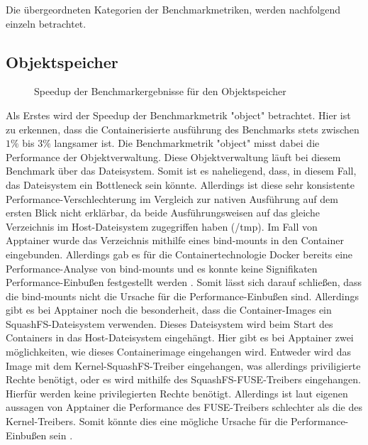 Die übergeordneten Kategorien der Benchmarkmetriken, werden nachfolgend einzeln betrachtet.

\subsection{Objektspeicher}

\begin{figure}
    \centering
    
    \caption{Speedup der Benchmarkergebnisse für den Objektspeicher}
    \label{fig:speedup_object}
\end{figure}

\FloatBarrier

Als Erstes wird der Speedup der Benchmarkmetrik "object" betrachtet. Hier ist zu erkennen, dass die Containerisierte ausführung des Benchmarks stets zwischen $1\%$ bis $3\%$ langsamer ist. Die Benchmarkmetrik "object" misst dabei die Performance der Objektverwaltung. Diese Objektverwaltung läuft bei diesem Benchmark über das Dateisystem. Somit ist es naheliegend, dass, in diesem Fall, das Dateisystem ein Bottleneck sein könnte. Allerdings ist diese sehr konsistente Performance-Verschlechterung im Vergleich zur nativen Ausführung auf dem ersten Blick nicht erklärbar, da beide Ausführungsweisen auf das gleiche Verzeichnis im Host-Dateisystem zugegriffen haben (/tmp). Im Fall von Apptainer wurde das Verzeichnis mithilfe eines bind-mounts in den Container eingebunden. Allerdings gab es für die Containertechnologie Docker bereits eine Performance-Analyse von bind-mounts und es konnte keine Signifikaten Performance-Einbußen festgestellt werden \cite[Vgl. 4]{dordevicFileSystemPerformance2022}. Somit lässt sich darauf schließen, dass die bind-mounts nicht die Ursache für die Performance-Einbußen sind. Allerdings gibt es bei Apptainer noch die besonderheit, dass die Container-Images ein SquashFS-Dateisystem verwenden. Dieses Dateisystem wird beim Start des Containers in das Host-Dateisystem eingehängt. Hier gibt es bei Apptainer zwei möglichkeiten, wie dieses Containerimage eingehangen wird. Entweder wird das Image mit dem Kernel-SquashFS-Treiber eingehangen, was allerdings priviligierte Rechte benötigt, oder es wird mithilfe des SquashFS-FUSE-Treibers eingehangen. Hierfür werden keine privilegierten Rechte benötigt. Allerdings ist laut eigenen aussagen von Apptainer die Performance des FUSE-Treibers schlechter als die des Kernel-Treibers. Somit könnte dies eine mögliche Ursache für die Performance-Einbußen sein \cite{apptainerSecurityApptainerApptainer}.  

